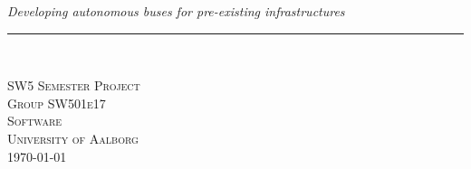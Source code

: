 \thispagestyle{empty}
\begin{center}
\vspace{3cm}

\phantom{hul}

\phantom{hul}

\phantom{hul}

\textsl{\Huge Developing autonomous buses for pre-existing infrastructures} \\ \vspace{1cm}

\rule{13cm}{1mm} \\ \vspace{1.5cm}
\vspace{1cm}


\vspace{2cm} 
\textsc{\Large SW5 Semester Project \\
Group SW501e17 \\
Software\\
University of Aalborg\\\today\\}
\end{center}